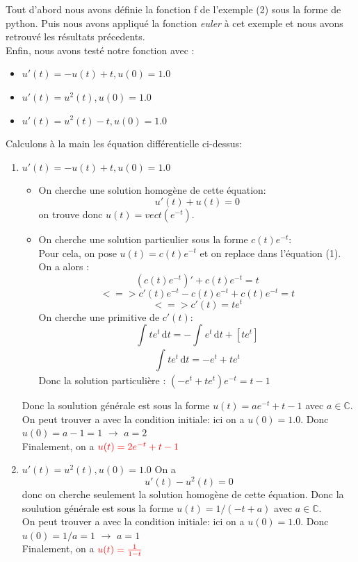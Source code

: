 \documentclass{article}
\begin{document}
Tout d'abord nous avons définie la fonction f de l'exemple (2) sous la forme de python. Puis nous avons appliqué la fonction \textit{euler} à cet exemple et nous avons retrouvé les résultats précedents.\\
Enfin, nous avons testé notre fonction avec :
\begin{itemize} 
\item $u'(t) =  -u(t) + t,  u(0)  =  1.0$ \\ 
\item $u'(t) =  u^2(t),  u(0)  =  1.0$ \\ 
\item $u'(t) =  u^2(t) - t,  u(0)  =  1.0$
\end{itemize}
	Calculons à la main les équation différentielle ci-dessus:
\begin{enumerate}
   \item $u'(t) =  -u(t) + t,  u(0)  =  1.0$ \\
   \begin{itemize}
     \item On cherche une solution homogène de cette équation: $$ u'(t)+ u(t)=0 $$
on trouve donc $ u(t)= vect({e^{-t}})$.
     \item On cherche une solution particulier sous la forme $c(t)e^{-t}$:\\
Pour cela, on pose $u(t)= c(t)e^{-t}$ et on replace dans l'équation (1).\\
On a alors :$$ (c(t)e^{-t})' + c(t)e^{-t} = t $$
	$$<=> c'(t)e^{-t}-c(t)e^{-t}+c(t)e^{-t} = t $$
	$$<=> c'(t)=te^{t} $$
On cherche une primitive de $c'(t)$:
$$\int_{}^{} te^{t} \, \mathrm{d}t = -\int_{}^{} e^{t} \, \mathrm{d}t + [te^{t}]$$
$$\int_{}^{} te^{t} \, \mathrm{d}t = -e^{t}+te^{t}  $$
Donc la solution particulière : $(-e^{t}+te^{t})e^{-t} = t-1 $
   \end{itemize}
Donc la soulution générale est sous la forme $u(t)=ae^{-t}+t-1$ avec $a \in  \mathbb{C} $.\\
On peut trouver a avec la condition initiale: ici on a $ u(0)=1.0 $. Donc $ u(0)= a-1=1 $ $\rightarrow$ $a = 2$\\
Finalement, on a $ \color{red} u(t)= 2e^{-t} + t - 1 $
   \item $ u'(t) =  u^2(t),  u(0)  =  1.0$
On a $$ u'(t) - u^2(t)=0 $$ donc on cherche seulement la solution homogène de cette équation. 
Donc la soulution générale est sous la forme $u(t)=1/(-t+a)$ avec $a \in  \mathbb{C} $.\\
On peut trouver a avec la condition initiale: ici on a $ u(0)=1.0 $. Donc $ u(0)=1/a =1 $ $\rightarrow$ $a = 1$\\
Finalement, on a $ \color{red}u(t)= \frac{1}{1-t} $
\end{enumerate}
\end{document}
